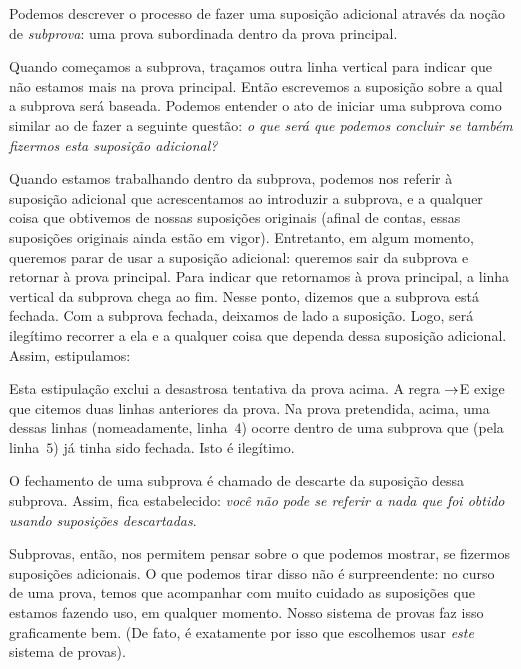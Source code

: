 Podemos descrever o processo de fazer uma suposição adicional através da noção de \emph{subprova}: uma prova subordinada dentro da prova principal. 

Quando começamos a subprova, traçamos outra linha vertical para indicar que não estamos mais na prova principal. Então escrevemos a suposição sobre a qual a subprova será baseada.  Podemos entender o ato de iniciar uma subprova como similar ao de fazer a seguinte questão:  \emph{o que será que podemos concluir se também fizermos esta suposição adicional?}

Quando estamos trabalhando dentro da subprova, podemos nos referir à suposição adicional que acrescentamos ao introduzir a subprova,  e a qualquer coisa que obtivemos de nossas suposições originais (afinal de contas, essas suposições originais ainda estão em vigor). Entretanto, em algum momento,  queremos parar de usar a suposição adicional: queremos sair da subprova e retornar à prova principal. Para indicar que retornamos à prova principal, a linha vertical da subprova chega ao fim.  Nesse ponto, dizemos que a subprova está fechada. Com a subprova fechada, deixamos de lado a suposição.  Logo, será ilegítimo recorrer a ela e a qualquer coisa que dependa dessa suposição adicional. Assim, estipulamos:


Esta estipulação exclui a desastrosa tentativa da prova acima. A regra $\rightarrow$E exige que citemos duas linhas anteriores da prova. Na prova pretendida, acima, uma dessas linhas (nomeadamente, linha~$4$)  ocorre dentro de uma subprova que (pela linha~$5$) já tinha sido fechada. Isto é ilegítimo. 

O fechamento de uma subprova é chamado de descarte da suposição dessa subprova. Assim, fica estabelecido: \emph{você não pode se referir a nada que foi obtido usando suposições descartadas}. 

Subprovas, então, nos permitem pensar sobre o que podemos mostrar,  se fizermos suposições adicionais.  O que podemos  tirar disso não é surpreendente: no curso de uma prova, temos que acompanhar com muito cuidado as suposições que estamos fazendo uso, em qualquer momento.  Nosso sistema de provas faz isso graficamente bem. (De fato, é exatamente por isso que escolhemos usar  \emph{este}  sistema de provas).

